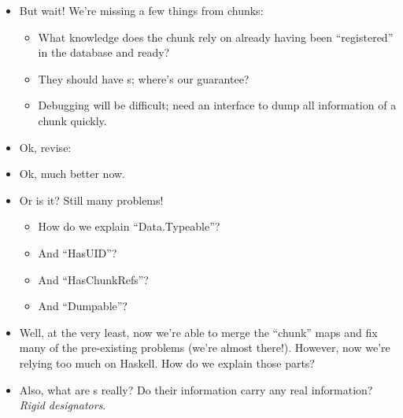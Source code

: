 \begin{itemize}

      \item But wait! We're missing a few things from chunks:
            \begin{itemize}

                  \item What knowledge does the chunk rely on already having
                        been ``registered'' in the database and ready?

                  \item They should have \UID{}s; where's our guarantee?

                  \item Debugging will be difficult; need an interface to dump
                        all information of a chunk quickly.

            \end{itemize}

      \item Ok, revise: 

      \item Ok, much better now.

      \item Or is it? Still many problems!
            \begin{itemize}

                  \item How do we explain ``Data.Typeable''?

                  \item And ``HasUID''?

                  \item And ``HasChunkRefs''?

                  \item And ``Dumpable''?

            \end{itemize}

      \item Well, at the very least, now we're able to merge the ``chunk'' maps
            and fix many of the pre-existing problems (we're almost there!).
            However, now we're relying too much on Haskell. How do we explain
            those parts?

      \item Also, what are \UID{}s really? Do their information carry any real
            information? \textit{Rigid designators}.

\end{itemize}

